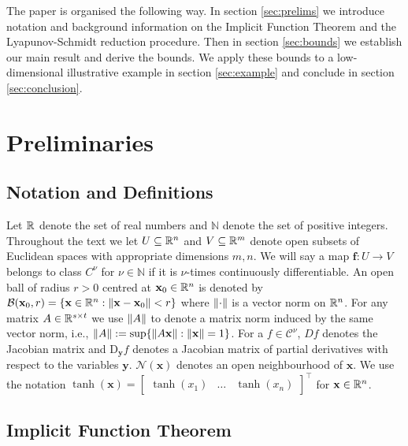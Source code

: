 \documentclass[letterpaper, 10 pt, conference, dvipsnames]{ieeeconf}
\begin{document}
The paper is organised the following way. In section \ref{sec:prelims} we introduce notation and background information on the Implicit Function Theorem and the Lyapunov-Schmidt reduction procedure. Then in section \ref{sec:bounds} we establish our main result and derive the bounds. We apply these bounds to a low-dimensional illustrative example in section \ref{sec:example} and conclude in section \ref{sec:conclusion}.



\section{Preliminaries \label{sec:prelims}}



\subsection{Notation and Definitions}

Let \(\R\) denote the set of real numbers and \(\mathbb{N}\)  denote the set of positive integers.
Throughout the text we let \(U \subseteq \R[n]\) and \(V \subseteq \R[m]\) denote open subsets of Euclidean spaces with appropriate dimensions \(m,n\).
We will say a map \(\mathbf{f}:U \to V\) belongs to class \(C^\nu\) for \(\nu\in\mathbb{N}\) if it is \(\nu\)-times continuously differentiable.
An open ball of radius \(r>0\) centred at \(\mathbf{x}_0 \in \R[n]\) is denoted by \(\mathcal{B}(\mathbf{x}_0,r) = \{\mathbf{x}\in\R[n]:\norm{\mathbf{x}-\mathbf{x}_0}<r\}\) where \(\norm{\cdot}\) is a vector norm on \(\R[n]\).
For any matrix \(A\in\R[s \times t]\) we use \(\norm{A}\) to denote a matrix norm induced by the same vector norm, i.e., \(\norm{A} := \sup\{\norm{A\mathbf{x}}:\norm{\mathbf{x}}=1\}\).
For a \(f \in \mathcal{C}^{\nu}\), \(Df\) denotes the Jacobian matrix and \(\mathrm{D}_{\mathbf{y}} f\) denotes a Jacobian matrix of partial derivatives with respect to the variables \(\mathbf{y}\). \({\mathcal{N}}(\mathbf{x})\) denotes an open neighbourhood of \(\mathbf{x}\).
We use the notation \(\tanh(\mathbf{x}) = \begin{bmatrix} \tanh(x_1) & \dots & \tanh(x_n) \end{bmatrix}^\top\) for \(\mathbf{x} \in \R[n]\).



\subsection{Implicit Function Theorem}
\end{document}
